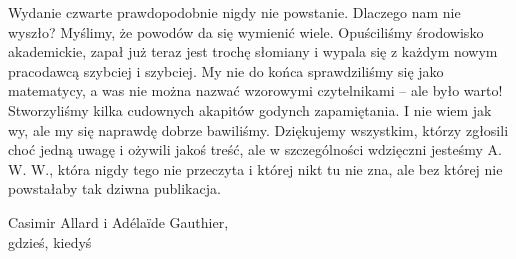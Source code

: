 Wydanie czwarte prawdopodobnie nigdy nie powstanie.
Dlaczego nam nie wyszło? 
Myślimy, że powodów da się wymienić wiele.
Opuściliśmy środowisko akademickie, zapał już teraz jest trochę słomiany i wypala się z każdym nowym pracodawcą szybciej i szybciej.
My nie do końca sprawdziliśmy się jako matematycy, a was nie można nazwać wzorowymi czytelnikami -- ale było warto!
Stworzyliśmy kilka cudownych akapitów godynch zapamiętania.
I nie wiem jak wy, ale my się naprawdę dobrze bawiliśmy.
Dziękujemy wszystkim, którzy zgłosili choć jedną uwagę i ożywili jakoś treść, ale w szczególności wdzięczni jesteśmy A. W. W., która nigdy tego nie przeczyta i której nikt tu nie zna, ale bez której nie powstałaby tak dziwna publikacja.

\begin{flushright}
Casimir Allard i Adélaïde Gauthier,\\gdzieś, kiedyś
\end{flushright}


